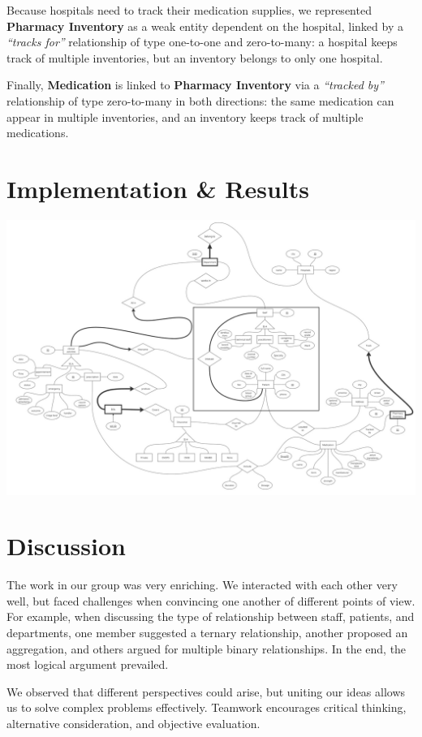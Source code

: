 \documentclass[a4paper,12pt]{article}
\begin{document}
Because hospitals need to track their medication supplies, we represented \textbf{Pharmacy Inventory} as a weak entity dependent on the hospital, linked by a \textit{“tracks for”} relationship of type one-to-one and zero-to-many: a hospital keeps track of multiple inventories, but an inventory belongs to only one hospital.

Finally, \textbf{Medication} is linked to \textbf{Pharmacy Inventory} via a \textit{“tracked by”} relationship of type zero-to-many in both directions: the same medication can appear in multiple inventories, and an inventory keeps track of multiple medications.


\section{Implementation \& Results}
\begin{center}
    \includegraphics[width=1\textwidth, keepaspectratio]{Figures/lab2.jpg}
\end{center}

\section{Discussion}
The work in our group was very enriching. We interacted with each other very well, but faced challenges when convincing one another of different points of view. For example, when discussing the type of relationship between staff, patients, and departments, one member suggested a ternary relationship, another proposed an aggregation, and others argued for multiple binary relationships. In the end, the most logical argument prevailed.

We observed that different perspectives could arise, but uniting our ideas allows us to solve complex problems effectively. Teamwork encourages critical thinking, alternative consideration, and objective evaluation.
\end{document}
